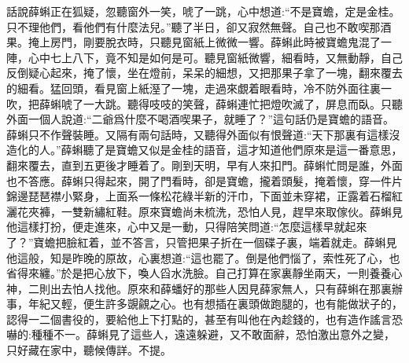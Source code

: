


\begin{parag}
    話說薛蝌正在狐疑，忽聽窗外一笑，唬了一跳，心中想道:“不是寶蟾，定是金桂。只不理他們，看他們有什麼法兒。”聽了半日，卻又寂然無聲。自己也不敢喫那酒果。掩上房門，剛要脫衣時，只聽見窗紙上微微一響。薛蝌此時被寶蟾鬼混了一陣，心中七上八下，竟不知是如何是可。聽見窗紙微響，細看時，又無動靜，自己反倒疑心起來，掩了懷，坐在燈前，呆呆的細想，又把那果子拿了一塊，翻來覆去的細看。猛回頭，看見窗上紙溼了一塊，走過來覷着眼看時，冷不防外面往裏一吹，把薛蝌唬了一大跳。聽得吱吱的笑聲，薛蝌連忙把燈吹滅了，屏息而臥。只聽外面一個人說道:“二爺爲什麼不喝酒喫果子，就睡了？”這句話仍是寶蟾的語音。薛蝌只不作聲裝睡。又隔有兩句話時，又聽得外面似有恨聲道:“天下那裏有這樣沒造化的人。”薛蝌聽了是寶蟾又似是金桂的語音，這才知道他們原來是這一番意思，翻來覆去，直到五更後才睡着了。剛到天明，早有人來扣門。薛蝌忙問是誰，外面也不答應。薛蝌只得起來，開了門看時，卻是寶蟾，攏着頭髮，掩着懷，穿一件片錦邊琵琶襟小緊身，上面系一條松花綠半新的汗巾，下面並未穿裙，正露着石榴紅灑花夾褲，一雙新繡紅鞋。原來寶蟾尚未梳洗，恐怕人見，趕早來取傢伙。薛蝌見他這樣打扮，便走進來，心中又是一動，只得陪笑問道:“怎麼這樣早就起來了？”寶蟾把臉紅着，並不答言，只管把果子折在一個碟子裏，端着就走。薛蝌見他這般，知是昨晚的原故，心裏想道:“這也罷了。倒是他們惱了，索性死了心，也省得來纏。”於是把心放下，喚人舀水洗臉。自己打算在家裏靜坐兩天，一則養養心神，二則出去怕人找他。原來和薛蟠好的那些人因見薛家無人，只有薛蝌在那裏辦事，年紀又輕，便生許多覬覦之心。也有想插在裏頭做跑腿的，也有能做狀子的，認得一二個書役的，要給他上下打點的，甚至有叫他在內趁錢的，也有造作謠言恐嚇的:種種不一。薛蝌見了這些人，遠遠躲避，又不敢面辭，恐怕激出意外之變，只好藏在家中，聽候傳詳。不提。
\end{parag}


